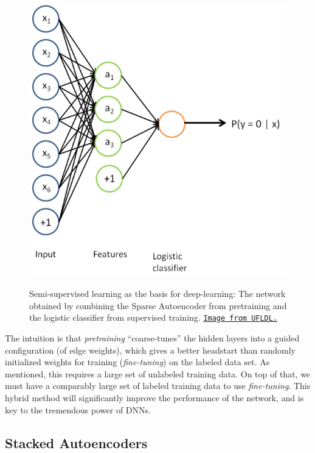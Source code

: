 \documentclass[12pt]{article}  %
\begin{document}
\begin{figure}[ht]
\centering
\includegraphics[scale=0.8]{images/CombinedAE.png}\\
\caption{Semi-supervised learning as the basis for deep-learning: The network obtained by combining the Sparse Autoencoder from pretraining and the logistic classifier from supervised training. \href{http://deeplearning.stanford.edu/wiki/index.php/Self-Taught_Learning_to_Deep_Networks}{\tt Image from UFLDL.}}\label{combinedAE-fig}
\end{figure}


The intuition is that \emph{pretraining} ``coarse-tunes'' the hidden layers into a guided configuration (of edge weights), which gives a better headstart than randomly initialized weights for training (\emph{fine-tuning}) on the labeled data set. As mentioned, this requires a large set of unlabeled training data. On top of that, we must have a comparably large set of labeled training data to use \emph{fine-tuning}. This hybrid method will significantly improve the performance of the network, and is key to the tremendous power of DNNs.






\subsection{Stacked Autoencoders}
\end{document}
